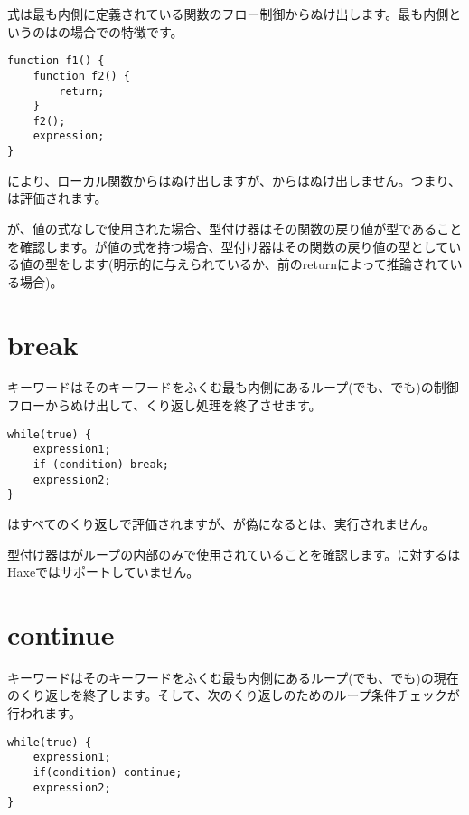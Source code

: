 式は最も内側に定義されている関数のフロー制御からぬけ出します。最も内側というのはの場合での特徴です。

\begin{lstlisting}
function f1() {
	function f2() {
		return;
	}
	f2();
	expression;
}
\end{lstlisting}

により、ローカル関数からはぬけ出しますが、からはぬけ出しません。つまり、は評価されます。

が、値の式なしで使用された場合、型付け器はその関数の戻り値が型であることを確認します。が値の式を持つ場合、型付け器はその関数の戻り値の型としている値の型をします(明示的に与えられているか、前のreturnによって推論されている場合)。

\section{break}
\label{expression-break}

キーワードはそのキーワードをふくむ最も内側にあるループ(でも、でも)の制御フローからぬけ出して、くり返し処理を終了させます。

\begin{lstlisting}
while(true) {
	expression1;
	if (condition) break;
	expression2;
}
\end{lstlisting}

はすべてのくり返しで評価されますが、が偽になるとは、実行されません。

型付け器はがループの内部のみで使用されていることを確認します。に対するはHaxeではサポートしていません。

\section{continue}
\label{expression-continue}

キーワードはそのキーワードをふくむ最も内側にあるループ(でも、でも)の現在のくり返しを終了します。そして、次のくり返しのためのループ条件チェックが行われます。

\begin{lstlisting}
while(true) {
	expression1;
	if(condition) continue;
	expression2;
}
\end{lstlisting}

